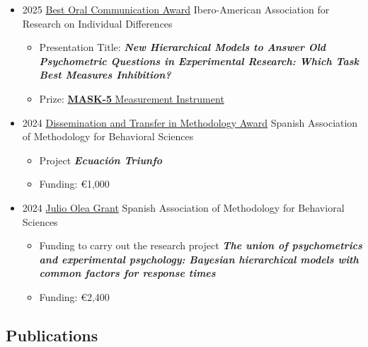 \documentclass[
  letterpaper,
  DIV=11,
  numbers=noendperiod]{scrartcl}
\providecommand{\tightlist}{%
  \setlength{\itemsep}{0pt}\setlength{\parskip}{0pt}}
\begin{document}
\begin{itemize}
\tightlist
\item
  2025 \textbar{}
  \href{https://sites.google.com/view/xiv-jornadas-aiidi-2025/inicio}{Best
  Oral Communication Award} \textbar{} Ibero-American Association for
  Research on Individual Differences

  \begin{itemize}
  \tightlist
  \item
    Presentation Title: \textbf{\emph{New Hierarchical Models to Answer
    Old Psychometric Questions in Experimental Research: Which Task Best
    Measures Inhibition?}}\\
  \item
    Prize:
    \href{https://www.hogrefe-tea.com/public/catalogo/producto/MASK-5-Cuestionario-de-Personalidad-de-los-Big-Five}{\textbf{MASK-5}
    Measurement Instrument}
  \end{itemize}
\item
  2024 \textbar{}
  \href{https://www.aemcco.org/listado_noimg.php?Seccion=Premios\%20AEMCCO}{Dissemination
  and Transfer in Methodology Award} \textbar{} Spanish Association of
  Methodology for Behavioral Sciences

  \begin{itemize}
  \tightlist
  \item
    Project \textbf{\emph{Ecuación Triunfo}}\\
  \item
    Funding: €1,000
  \end{itemize}
\item
  2024 \textbar{}
  \href{https://www.aemcco.org/listado_noimg.php?Seccion=Ayudas\%20AEMCCO}{Julio
  Olea Grant} \textbar{} Spanish Association of Methodology for
  Behavioral Sciences

  \begin{itemize}
  \tightlist
  \item
    Funding to carry out the research project \textbf{\emph{The union of
    psychometrics and experimental psychology: Bayesian hierarchical
    models with common factors for response times}}\\
  \item
    Funding: €2,400
  \end{itemize}
\end{itemize}

\subsection{\texorpdfstring{
Publications}{ Publications}}\label{publications}
\end{document}
